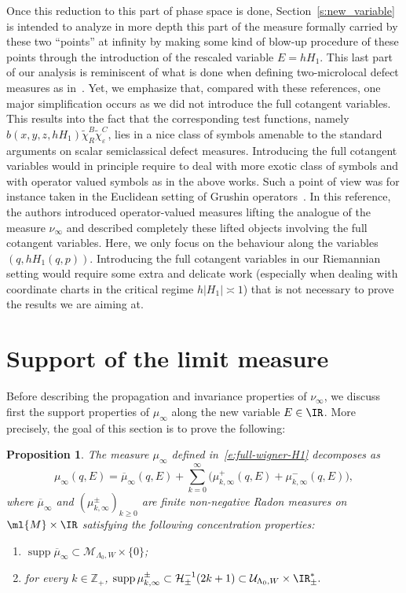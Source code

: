 \documentclass[JEP,XML,SOM,Unicode, NoEqCountersInSection,published]{cedram}
\theoremstyle{plain}
\newtheorem{prop}[theo]{Proposition}
\theoremstyle{definition}
\theoremstyle{remark}
\begin{document}
Once this reduction to this part of phase space is done, Section~\ref{s:new_variable} is intended to analyze in more depth this part of the measure formally carried by these two ``points'' at infinity by making some kind of blow-up procedure of these points through the introduction of the rescaled variable $E=hH_1$. This last part of our analysis is reminiscent of what is done when defining two-microlocal defect measures as in~\cite{Fermanian95, Miller96, Nier96, Fermanian00, AnantharamanMacia14}. Yet, we emphasize that, compared with these references, one major simplification occurs as we did not introduce the full cotangent variables. This results into the fact that the corresponding test functions, namely $b(x,y,z,hH_1)\tilde{\chi}_R^B\tilde{\chi}_\varepsilon^C$, lies in a nice class of symbols amenable to the standard arguments on scalar semiclassical defect measures. Introducing the full cotangent variables would in principle require to deal with more exotic class of symbols and with operator valued symbols as in the above works. Such a point of view was for instance taken in the Euclidean setting of Grushin operators~\cite{ArnaizSun22}. In this reference, the authors introduced operator-valued measures lifting the analogue of the measure $\nu_\infty$ and \hbox{described} completely these lifted objects involving the full cotangent variables. Here, we only focus on the behaviour along the variables $(q,hH_1(q,p))$. Introducing the full cotangent variables in our Riemannian setting would require some extra and delicate work (especially when dealing with coordinate charts in the critical regime $h|H_1|\asymp 1$) that is not necessary to prove the results we are aiming at.

\section{Support of the limit measure}\label{s:support}

Before describing the propagation and invariance properties of $\nu_\infty$, we discuss first the support properties of $\mu_\infty$ along the new variable $E\in \IR$. More precisely, the goal of this section is to prove the following:

\begin{prop}
\label{p:support_properties}
The measure $\mu_\infty$ defined in~\eqref{e:full-wigner-H1} decomposes as
\[
\mu_\infty(q,E) = \overline{\mu}_\infty(q,E) + \sum_{k=0}^\infty \big(\mu_{k,\infty}^+(q,E) + \mu_{k,\infty}^-(q,E) \big),
\]
where $\overline{\mu}_\infty$ and $(\mu_{k,\infty}^\pm)_{k\geq 0}$ are finite non-negative Radon measures on $\ml{M}\times\IR$ satisfying the
following concentration properties:
\begin{enumerate}\renewcommand{\theenumi}{S.\arabic{enumi}}
\item $\operatorname{supp} \overline{\mu}_\infty \subset \mathcal{M}_{\Lambda_0,W} \times \{ 0 \}$;

\item for every $k \in \mathbb{Z}_+$, $ \operatorname{supp} \mu_{k,\infty}^\pm \subset \mathcal{H}_\pm^{-1}(2k+1) \subset \mathcal{U}_{\Lambda_0,W}\times\IR_{\pm}^*.$
\end{enumerate}
\end{prop}
\end{document}
